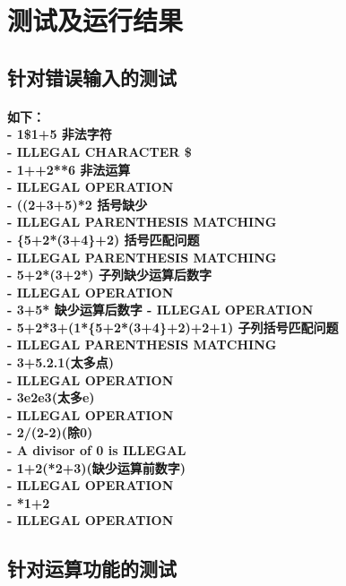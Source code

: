 \documentclass[UTF8]{ctexart}
\begin{document}
\section{测试及运行结果}
\subsection{针对错误输入的测试}
\paragraph{
如下：\\
- 1\$1+5  非法字符\\
- ILLEGAL CHARACTER \$ \\
- 1++2**6 非法运算\\
- ILLEGAL OPERATION \\
- ((2+3+5)*2 括号缺少\\
- ILLEGAL PARENTHESIS MATCHING \\
- \{5+2*(3+4\}+2) 括号匹配问题\\
- ILLEGAL PARENTHESIS MATCHING \\
- 5+2*(3+2*) 子列缺少运算后数字\\
- ILLEGAL OPERATION \\
- 3+5* 缺少运算后数字
- ILLEGAL OPERATION\\
- 5+2*3+(1*\{5+2*(3+4\}+2)+2+1) 子列括号匹配问题\\
- ILLEGAL PARENTHESIS MATCHING \\
- 3+5.2.1(太多点)\\
- ILLEGAL OPERATION\\
- 3e2e3(太多e)\\
- ILLEGAL OPERATION \\
- 2/(2-2)(除0)\\
- A divisor of 0 is ILLEGAL \\
- 1+2(*2+3)(缺少运算前数字)\\
- ILLEGAL OPERATION \\
- *1+2 \\
- ILLEGAL OPERATION
}
\subsection{针对运算功能的测试}
\end{document}
